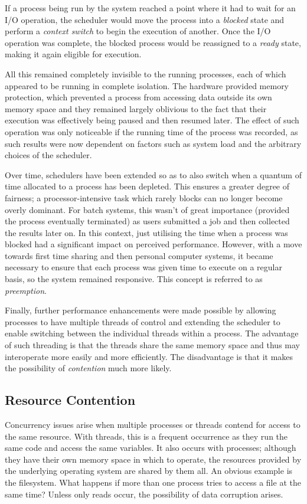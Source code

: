 If a process being run by the system reached a point where it had to
wait for an I/O operation, the scheduler would move the process into a
\emph{blocked} state and perform a \emph{context switch} to begin the
execution of another.  Once the I/O operation was complete, the
blocked process would be reassigned to a \emph{ready} state, making it
again eligible for execution.

All this remained completely invisible to the running processes, each
of which appeared to be running in complete isolation.  The hardware
provided memory protection, which prevented a process from accessing
data outside its own memory space and they remained largely oblivious
to the fact that their execution was effectively being paused and then
resumed later.  The effect of such operation was only noticeable if
the running time of the process was recorded, as such results were now
dependent on factors such as system load and the arbitrary choices of
the scheduler.

Over time, schedulers have been extended so as to also switch when a
quantum of time allocated to a process has been depleted.  This
ensures a greater degree of fairness; a processor-intensive task which
rarely blocks can no longer become overly dominant.  For batch
systems, this wasn't of great importance (provided the process
eventually terminated) as users submitted a job and then collected the
results later on.  In this context, just utilising the time when a
process was blocked had a significant impact on perceived performance.
However, with a move towards first time sharing and then personal
computer systems, it became necessary to ensure that each process was
given time to execute on a regular basis, so the system remained
responsive.  This concept is referred to as \emph{preemption}.

Finally, further performance enhancements were made possible by
allowing processes to have multiple threads of control and extending
the scheduler to enable switching between the individual threads
within a process.  The advantage of such threading is that the threads
share the same memory space and thus may interoperate more easily and
more efficiently.  The disadvantage is that it makes the possibility
of \emph{contention} much more likely.

\subsection{Resource Contention}

Concurrency issues arise when multiple processes or threads contend
for access to the same resource.  With threads, this is a frequent
occurrence as they run the same code and access the same variables.
It also occurs with processes; although they have their own memory
space in which to operate, the resources provided by the underlying
operating system are shared by them all.  An obvious example is the
filesystem.  What happens if more than one process tries to access a
file at the same time?  Unless only reads occur, the possibility of
data corruption arises.

